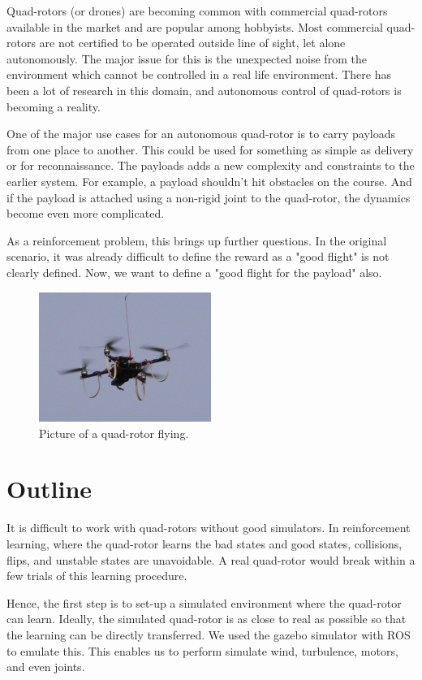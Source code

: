 \documentclass[hidelinks,BTech]{iitmdiss}
\begin{document}
Quad-rotors (or drones) are becoming common with commercial quad-rotors available in the market and are popular among hobbyists. Most commercial quad-rotors are not certified to be operated outside line of sight, let alone autonomously. The major issue for this is the unexpected noise from the environment which cannot be controlled in a real life environment. There has been a lot of research in this domain, and autonomous control of quad-rotors is becoming a reality.

One of the major use cases for an autonomous quad-rotor is to carry payloads from one place to another. This could be used for something as simple as delivery or for reconnaissance. The payloads adds a new complexity and constraints to the earlier system. For example, a payload shouldn't hit obstacles on the course. And if the payload is attached using a non-rigid joint to the quad-rotor, the dynamics become even more complicated.

As a reinforcement problem, this brings up further questions. In the original scenario, it was already difficult to define the reward as a "good flight" is not clearly defined. Now, we want to define a "good flight for the payload" also.

\begin{figure}[H]
  \centering
    \includegraphics[width=0.5\textwidth]{quadrotor.jpg}
    \caption{Picture of a quad-rotor flying.}
\end{figure}

\section{Outline}

It is difficult to work with quad-rotors without good simulators. In reinforcement learning, where the quad-rotor learns the bad states and good states, collisions, flips, and unstable states are unavoidable. A real quad-rotor would break within a few trials of this learning procedure.

Hence, the first step is to set-up a simulated environment where the quad-rotor can learn. Ideally, the simulated quad-rotor is as close to real as possible so that the learning can be directly transferred. We used the gazebo simulator with ROS to emulate this. This enables us to perform simulate wind, turbulence, motors, and even joints.
\end{document}
